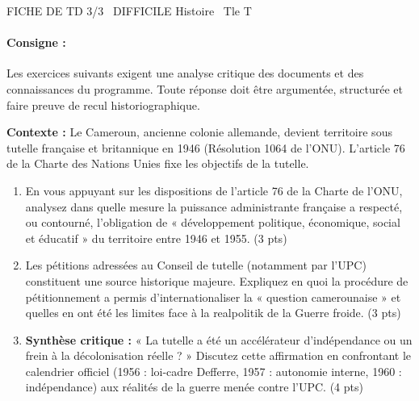 \documentclass[11pt]{article}
\begin{document}
\begin{tcolorbox}[enhanced,colback=popink,colframe=popink,arc=10pt,boxrule=0pt,left=12pt,right=12pt,top=9pt,bottom=9pt]
{\color{white}\popxbold\small FICHE DE TD 3/3 \textbullet\ DIFFICILE \hfill Histoire \textbullet\ Tle T\par}
\end{tcolorbox}
\vspace{4pt}

\paragraph{Consigne :} Les exercices suivants exigent une analyse critique des documents et des connaissances du programme. Toute réponse doit être argumentée, structurée et faire preuve de recul historiographique.

\begin{exercice}
\textbf{Contexte :} Le Cameroun, ancienne colonie allemande, devient territoire sous tutelle française et britannique en 1946 (Résolution 1064 de l'ONU). L'article 76 de la Charte des Nations Unies fixe les objectifs de la tutelle.
\begin{enumerate}
    \item En vous appuyant sur les dispositions de l'article 76 de la Charte de l'ONU, analysez dans quelle mesure la puissance administrante française a respecté, ou contourné, l'obligation de « développement politique, économique, social et éducatif » du territoire entre 1946 et 1955. (3 pts)
    \item Les pétitions adressées au Conseil de tutelle (notamment par l'UPC) constituent une source historique majeure. Expliquez en quoi la procédure de pétitionnement a permis d'internationaliser la « question camerounaise » et quelles en ont été les limites face à la realpolitik de la Guerre froide. (3 pts)
    \item \textbf{Synthèse critique :} « La tutelle a été un accélérateur d'indépendance ou un frein à la décolonisation réelle ? » Discutez cette affirmation en confrontant le calendrier officiel (1956 : loi-cadre Defferre, 1957 : autonomie interne, 1960 : indépendance) aux réalités de la guerre menée contre l'UPC. (4 pts)
\end{enumerate}
\end{exercice}
\end{document}
